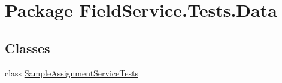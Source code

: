 \hypertarget{namespace_field_service_1_1_tests_1_1_data}{\section{Package Field\+Service.\+Tests.\+Data}
\label{namespace_field_service_1_1_tests_1_1_data}
}
\subsection*{Classes}
\begin{DoxyCompactItemize}
\item 
class \hyperlink{class_field_service_1_1_tests_1_1_data_1_1_sample_assignment_service_tests}{Sample\+Assignment\+Service\+Tests}
\end{DoxyCompactItemize}
